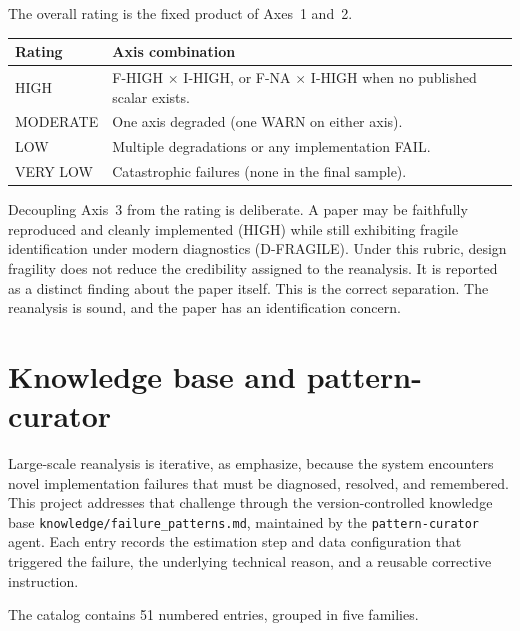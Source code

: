 The overall rating is the fixed product of Axes~1 and~2.

\begin{table}[H]
\centering
\footnotesize
\begin{tabularx}{\textwidth}{@{}l X@{}}
\toprule
\textbf{Rating} & \textbf{Axis combination} \\
\midrule
HIGH     & F-HIGH $\times$ I-HIGH, or F-NA $\times$ I-HIGH when no published scalar exists. \\
MODERATE & One axis degraded (one WARN on either axis). \\
LOW      & Multiple degradations or any implementation FAIL. \\
VERY LOW & Catastrophic failures (none in the final sample). \\
\bottomrule
\end{tabularx}
\end{table}

Decoupling Axis~3 from the rating is deliberate. A paper may be faithfully reproduced and cleanly implemented (HIGH) while still exhibiting fragile identification under modern diagnostics (D-FRAGILE). Under this rubric, design fragility does not reduce the credibility assigned to the reanalysis. It is reported as a distinct finding about the paper itself. This is the correct separation. The reanalysis is sound, and the paper has an identification concern.


\section{Knowledge base and pattern-curator}
\label{sec:appc_knowledge}

Large-scale reanalysis is iterative, as \textcite{xu2026scaling} emphasize, because the system encounters novel implementation failures that must be diagnosed, resolved, and remembered. This project addresses that challenge through the version-controlled knowledge base \texttt{knowledge/failure\_patterns.md}, maintained by the \texttt{pattern-curator} agent. Each entry records the estimation step and data configuration that triggered the failure, the underlying technical reason, and a reusable corrective instruction.

The catalog contains 51 numbered entries, grouped in five families.


